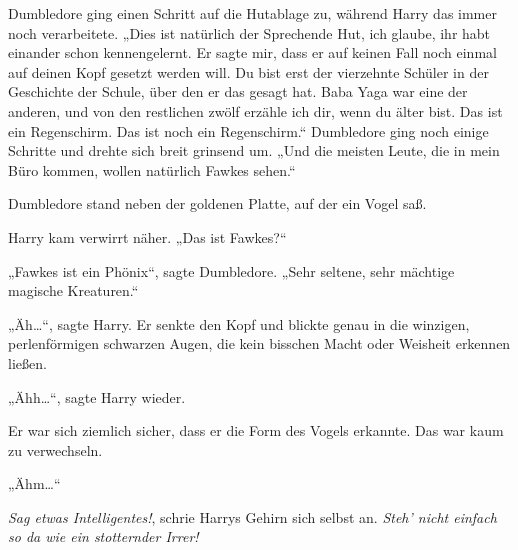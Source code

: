Dumbledore ging einen Schritt auf die Hutablage zu, während Harry das immer noch verarbeitete. „Dies ist natürlich der Sprechende Hut, ich glaube, ihr habt einander schon kennengelernt. Er sagte mir, dass er auf keinen Fall noch einmal auf deinen Kopf gesetzt werden will. Du bist erst der vierzehnte Schüler in der Geschichte der Schule, über den er das gesagt hat. Baba Yaga war eine der anderen, und von den restlichen zwölf erzähle ich dir, wenn du älter bist. Das ist ein Regenschirm. Das ist noch ein Regenschirm.“ Dumbledore ging noch einige Schritte und drehte sich breit grinsend um. „Und die meisten Leute, die in mein Büro kommen, wollen natürlich Fawkes sehen.“

Dumbledore stand neben der goldenen Platte, auf der ein Vogel saß.

Harry kam verwirrt näher. „Das ist Fawkes?“

„Fawkes ist ein Phönix“, sagte Dumbledore. „Sehr seltene, sehr mächtige magische Kreaturen.“

„Äh…“, sagte Harry. Er senkte den Kopf und blickte genau in die winzigen, perlenförmigen schwarzen Augen, die kein bisschen Macht oder Weisheit erkennen ließen.

„Ähh…“, sagte Harry wieder.

Er war sich ziemlich sicher, dass er die Form des Vogels erkannte. Das war kaum zu verwechseln.

„Ähm…“

\emph{Sag etwas Intelligentes!}, schrie Harrys Gehirn sich selbst an. \emph{Steh’ nicht einfach so da wie ein stotternder Irrer!}

